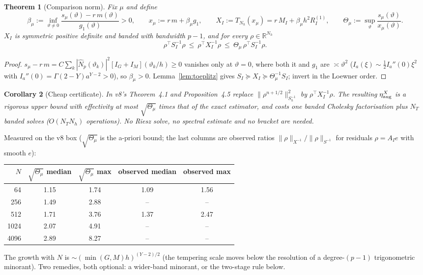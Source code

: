 \documentclass[11pt]{amsart}
\newtheorem{theorem}{Theorem}[section]
\newtheorem{corollary}[theorem]{Corollary}
\theoremstyle{remark}
\newcommand{\R}{\mathbb R}
\newcommand{\norm}[1]{\lVert #1\rVert}
\newcommand{\T}{T}
\begin{document}
\begin{theorem}[Comparison norm]\label{thm:comparison}
Fix $\mu$ and define
\[
 \beta_\mu:=\inf_{\vartheta\ne0}\frac{s_\mu(\vartheta)-r\,m(\vartheta)}{g_1(\vartheta)}>0,
 \qquad
 x_\mu:=r\,m+\beta_\mu g_1,\qquad
 X_I:=\T_{N_h}(x_\mu)=r\,M_I+\beta_\mu h^2R^{(1)}_I,
 \qquad
 \Theta_\mu:=\sup_\vartheta\frac{s_\mu(\vartheta)}{x_\mu(\vartheta)}.
\]
$X_I$ is symmetric positive definite and banded with bandwidth $p-1$, and
for every $\rho\in\R^{N_h}$
\begin{equation}
 \rho^\top S_I^{-1}\rho\ \le\ \rho^\top X_I^{-1}\rho\ \le\ \Theta_\mu\,\rho^\top S_I^{-1}\rho .
 \label{eq:comparison}
\end{equation}
\end{theorem}
\begin{proof}
$s_\mu-r\,m=C\sum_k|\widehat N_p(\vartheta_k)|^2[I_G+I_M](\vartheta_k/h)\ge0$ vanishes
only at $\vartheta=0$, where both it and $g_1$ are $\asymp\vartheta^2$
($I_a(\xi)\sim\tfrac12 I_a''(0)\xi^2$ with $I_a''(0)=\Gamma(2-Y)a^{Y-2}>0$), so
$\beta_\mu>0$.  Lemma~\ref{lem:toeplitz} gives $S_I\succeq X_I\succeq\Theta_\mu^{-1}S_I$;
invert in the Loewner order.
\end{proof}

\begin{corollary}[Cheap certificate]\label{cor:cheap}
In v8's Theorem~4.1 and Proposition~4.5 replace
$\norm{\rho^{n+1/2}}_{S_h^{-1}}^2$ by $\rho^\top X_I^{-1}\rho$.  The resulting
$\eta_{\rm aug}^X$ is a rigorous upper bound with effectivity at most
$\sqrt{\Theta_\mu}$ times that of the exact estimator, and costs one banded
Cholesky factorisation plus $N_T$ banded solves ($O(N_TN_h)$ operations).
No Riesz solve, no spectral estimate and no bracket are needed.
\end{corollary}

\noindent
Measured on the v8 box ($\sqrt{\Theta_\mu}$ is the a-priori bound; the last
columns are observed ratios $\norm\rho_{X^{-1}}/\norm\rho_{S^{-1}}$ for
residuals $\rho=A_Ie$ with smooth $e$):
\begin{center}\small
\begin{tabular}{rcccc}
\toprule
$N$ & $\sqrt{\Theta_\mu}$ median & $\sqrt{\Theta_\mu}$ max & observed median & observed max\\
\midrule
64 & 1.15 & 1.74 & 1.09 & 1.56\\
256 & 1.49 & 2.88 & -- & --\\
512 & 1.71 & 3.76 & 1.37 & 2.47\\
1024 & 2.07 & 4.91 & -- & --\\
4096 & 2.89 & 8.27 & -- & --\\
\bottomrule
\end{tabular}
\end{center}
The growth with $N$ is $\sim(\min(G,M)h)^{(Y-2)/2}$ (the tempering scale moves
below the resolution of a degree-$(p-1)$ trigonometric minorant).  Two
remedies, both optional: a wider-band minorant, or the two-stage rule below.
\end{document}
